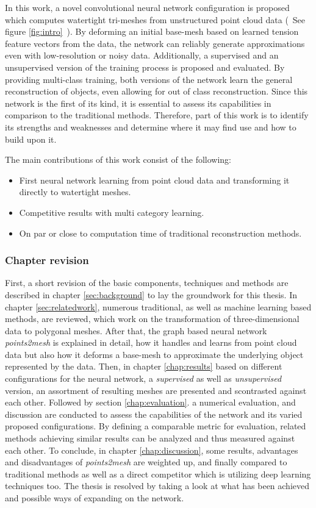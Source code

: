   In this work, a novel convolutional neural network configuration is proposed which computes watertight tri-meshes from unstructured point cloud data (~See figure \ref{fig:intro}~).
  By deforming an initial base-mesh based on learned tension feature vectors from the data, the network can reliably generate approximations
  even with low-resolution or noisy data. Additionally, a supervised and an unsupervised version of the training process is proposed and evaluated. 
  By providing multi-class training, both versions of the network learn the general reconstruction of objects, even allowing for out of class reconstruction.
  Since this network is the first of its kind, it is essential to assess its capabilities in comparison to the traditional methods. 
  Therefore, part of this work is to identify its strengths and weaknesses and determine where it may find use and how to build upon it.

  The main contributions of this work consist of the following:
  \begin{itemize}
    \item First neural network learning from point cloud data and transforming it directly to watertight meshes.
    \item Competitive results with multi category learning.
    \item On par or close to computation time of traditional reconstruction methods.
  \end{itemize}

  \subsubsection*{Chapter revision}
  First, a short revision of the basic components, techniques and methods are described in chapter \ref{sec:background} to lay the groundwork for this thesis. In chapter \ref{sec:relatedwork}, 
  numerous traditional, as well as machine learning based methods, are reviewed, which work on the transformation of three-dimensional data to polygonal
  meshes.
  After that, the graph based neural network \emph{points2mesh} is explained in detail, how it handles and learns from point cloud data but also how
  it deforms a base-mesh to approximate the underlying object represented by the data.
  Then, in chapter \ref{chap:results} based on different configurations for the neural network, a \emph{supervised} as well as \emph{unsupervised} version,
  an assortment of resulting meshes are presented and scontrasted against each other.
  Followed by section \ref{chap:evaluation}. a numerical evaluation, and discussion are conducted to assess the capabilities of the network and its 
  varied proposed configurations. By defining a comparable metric for evaluation, related methods achieving similar results can be analyzed and thus 
  measured against each other. To conclude, in chapter \ref{chap:discussion}, some results, advantages and disadvantages of \emph{points2mesh} 
  are weighted up, and finally compared to traditional methods as well as a direct competitor which is utilizing deep learning techniques too.
  The thesis is resolved by taking a look at what has been achieved and possible ways of expanding on the network.